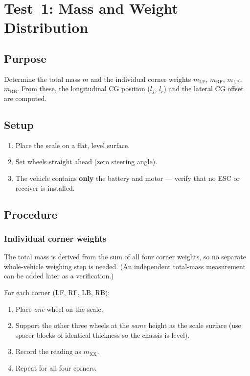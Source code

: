 \documentclass[a4paper,11pt]{article}
\begin{document}
\section{Test~1: Mass and Weight Distribution}
\label{sec:mass}

\subsection{Purpose}
Determine the total mass $m$ and the individual corner weights
$m_\text{LF}$, $m_\text{RF}$, $m_\text{LB}$, $m_\text{RB}$.  From
these, the longitudinal CG position ($l_f$, $l_r$) and the lateral
CG offset are computed.

\subsection{Setup}
\begin{enumerate}
  \item Place the scale on a flat, level surface.
  \item Set wheels straight ahead (zero steering angle).
  \item The vehicle contains \textbf{only} the battery and motor —
        verify that no ESC or receiver is installed.
\end{enumerate}

\subsection{Procedure}

\subsubsection{Individual corner weights}
The total mass is derived from the sum of all four corner weights,
so no separate whole-vehicle weighing step is needed.  (An independent
total-mass measurement can be added later as a verification.)

\noindent For each corner (LF, RF, LB, RB):
\begin{enumerate}
  \item Place \emph{one} wheel on the scale.
  \item Support the other three wheels at the \emph{same} height as the
        scale surface (use spacer blocks of identical thickness so the
        chassis is level).
  \item Record the reading as $m_\text{XX}$.
  \item Repeat for all four corners.
\end{enumerate}
\end{document}
